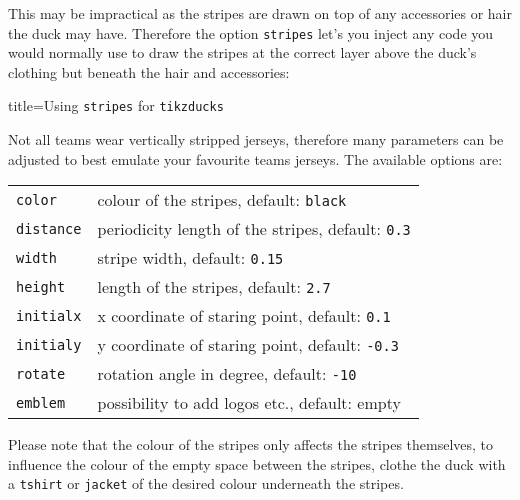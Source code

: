 \documentclass[parskip=half]{scrartcl}
\begin{document}
This may be impractical as the stripes are drawn on top of any accessories or hair the duck may have. Therefore the option \lstinline|stripes| let's you inject any code you would normally use to draw the stripes at the correct layer above the duck's clothing but beneath the hair and accessories:

\begin{tcblisting}{title={Using \texttt{stripes} for \texttt{tikzducks}}}
\begin{tikzpicture}
	\duck[longhair,|stripes|={\stripes}]
\end{tikzpicture}
\end{tcblisting}

Not all teams wear vertically stripped jerseys, therefore many parameters can be adjusted to best emulate your favourite teams jerseys. The available options are:

\begin{tabular}{@{}ll@{}}
	\lstinline|color|			& colour of the stripes, default: 		
													\lstinline|black| \\
  \lstinline|distance|	&	periodicity length of the stripes, default: 
  												 \lstinline|0.3| \\
  \lstinline|width|			&	stripe width, default: \lstinline|0.15| \\ 
  \lstinline|height|		&	length of the stripes, default: 
  												\lstinline|2.7| \\
  \lstinline|initialx|	&	x coordinate of staring point, default: 
  												\lstinline|0.1| \\
  \lstinline|initialy|	&	y coordinate of staring point, default: 
  												\lstinline|-0.3| \\
  \lstinline|rotate|		&	rotation angle in degree, default:
  												\lstinline|-10|\\
  \lstinline|emblem|		& possibility to add logos etc., default: empty\\
\end{tabular}

Please note that the colour of the stripes only affects the stripes themselves, to influence the colour of the empty space between the stripes, clothe the duck with a \lstinline|tshirt| or \lstinline|jacket| of the desired colour underneath the stripes.
\end{document}
